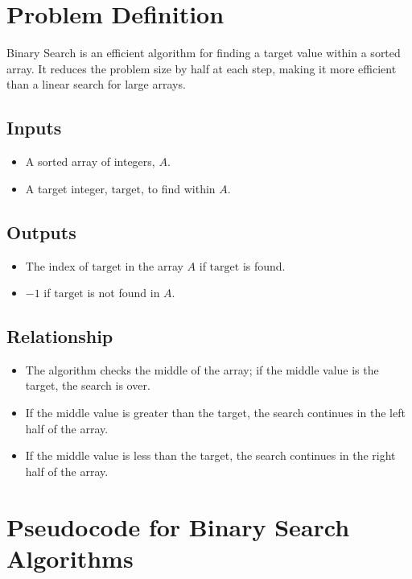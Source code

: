 \documentclass{article}
\begin{document}
\section{Problem Definition}
Binary Search is an efficient algorithm for finding a target value within a sorted array. It reduces the problem size by half at each step, making it more efficient than a linear search for large arrays.

\subsection{Inputs}
\begin{itemize}
    \item A sorted array of integers, \( A \).
    \item A target integer, \( \text{target} \), to find within \( A \).
\end{itemize}

\subsection{Outputs}
\begin{itemize}
    \item The index of \( \text{target} \) in the array \( A \) if \( \text{target} \) is found.
    \item \(-1\) if \( \text{target} \) is not found in \( A \).
\end{itemize}

\subsection{Relationship}
\begin{itemize}
    \item The algorithm checks the middle of the array; if the middle value is the target, the search is over.
    \item If the middle value is greater than the target, the search continues in the left half of the array.
    \item If the middle value is less than the target, the search continues in the right half of the array.
\end{itemize}

\section{Pseudocode for Binary Search Algorithms}
\end{document}
